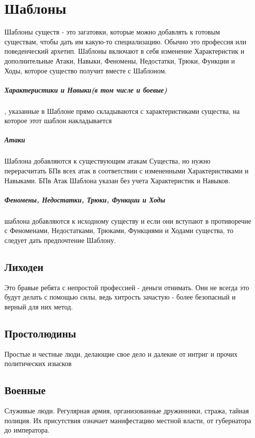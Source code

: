 \chapter{Шаблоны}
Шаблоны существ - это загатовки, которые можно добавлять к готовым существам, чтобы дать им какую-то специализацию. Обычно это профессия или поведенческий архетип.
\newline Шаблоны включают в себя изменение Характеристик и дополнительные Атаки, Навыки, Феномены, Недостатки, Трюки, Функции и Ходы, которое существо получит вместе с Шаблоном.
\paragraph{Характеристики и Навыки(в том числе и боевые)}, указанные в Шаблоне прямо складываются с характеристиками существа, на которое этот шаблон накладывается
\paragraph{Атаки} Шаблона добавляются к существующим атакам Существа, но нужно перерасчитать БПв всех атак в соответствии с измененными Характеристиками и Навыками. БПв Атак Шаблона указан без учета Характеристик и Навыков.
\paragraph{Феномены, Недостатки, Трюки, Функции и Ходы} шаблона добавляются к исходному существу и если они вступают в противоречие с Феноменами, Недостатками, Трюками, Функциями и Ходами существа, то следует дать предпочтение Шаблону.

\section{Лиходеи}
Это бравые ребята с непростой профессией - деньги отнимать. Они не всегда это будут делать с помощью силы, ведь хитрость зачастую - более безопасный и верный для них метод.

\section{Простолюдины}
Простые и честные люди, делающие свое дело и далекие от интриг и прочих политических изысков

\section{Военные}
Служивые люди. Регулярная армия, организованные дружинники, стража, тайная полиция. Их присутствия означает манифестацию местной власти, от губернатора до императора.

